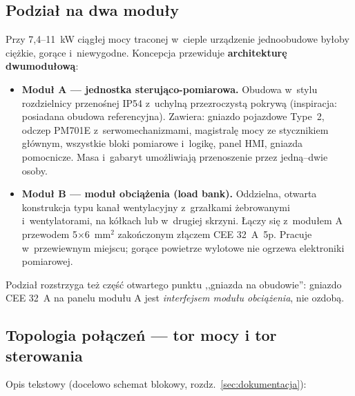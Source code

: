 \documentclass[11pt,a4paper]{article}
\begin{document}
\subsection{Podział na dwa moduły}

Przy 7,4--11~kW ciągłej mocy traconej w~cieple urządzenie jednoobudowe byłoby ciężkie, gorące i~niewygodne. Koncepcja przewiduje \textbf{architekturę dwumodułową}:

\begin{itemize}
\item \textbf{Moduł A --- jednostka sterująco-pomiarowa.} Obudowa w~stylu rozdzielnicy przenośnej IP54 z~uchylną przezroczystą pokrywą (inspiracja: posiadana obudowa referencyjna). Zawiera: gniazdo pojazdowe Type~2, odczep PM701E z~serwomechanizmami, magistralę mocy ze stycznikiem głównym, wszystkie bloki pomiarowe i~logikę, panel HMI, gniazda pomocnicze. Masa i~gabaryt umożliwiają przenoszenie przez jedną--dwie osoby.
\item \textbf{Moduł B --- moduł obciążenia (load bank).} Oddzielna, otwarta konstrukcja typu kanał wentylacyjny z~grzałkami żebrowanymi i~wentylatorami, na kółkach lub w~drugiej skrzyni. Łączy się z~modułem A przewodem 5$\times$6~mm$^2$ zakończonym złączem CEE 32~A~5p. Pracuje w~przewiewnym miejscu; gorące powietrze wylotowe nie ogrzewa elektroniki pomiarowej.
\end{itemize}

Podział rozstrzyga też część otwartego punktu ,,gniazda na obudowie'': gniazdo CEE 32~A na panelu modułu A jest \emph{interfejsem modułu obciążenia}, nie ozdobą.

\subsection{Topologia połączeń --- tor mocy i tor sterowania}
\label{sec:topologia}

Opis tekstowy (docelowo schemat blokowy, rozdz.~\ref{sec:dokumentacja}):
\end{document}
